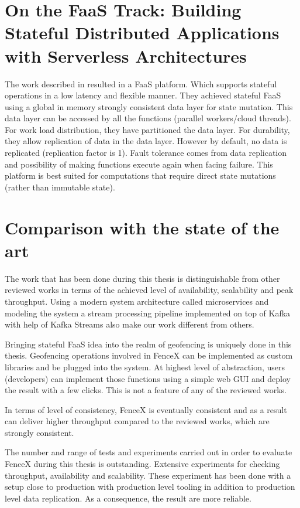 \documentclass[a4]{report}
\begin{document}
    \section{On the FaaS Track: Building Stateful Distributed Applications with Serverless Architectures}
    The work described in \cite{mutableStateless} resulted in a FaaS platform.
    Which supports stateful operations in a low latency and flexible manner.
    They achieved stateful FaaS using a global in memory strongly consistent data layer for state mutation.
    This data layer can be accessed by all the functions (parallel workers/cloud threads).
    For work load distribution, they have partitioned the data layer.
    For durability, they allow replication of data in the data layer.
    However by default, no data is replicated (replication factor is 1).
    Fault tolerance comes from data replication and possibility of making functions execute again when facing failure.
    This platform is best suited for computations that require direct state mutations (rather than immutable state).


    \section{Comparison with the state of the art}
    The work that has been done during this thesis is distinguishable from other reviewed works in terms of the
    achieved level of availability, scalability and peak throughput.
    Using a modern system architecture called microservices and modeling the system a stream processing pipeline
    implemented on top of Kafka with help of Kafka Streams also make our work different from others.

    Bringing stateful FaaS idea into the realm of geofencing is uniquely done in this thesis.
    Geofencing operations involved in FenceX can be implemented as custom libraries and be plugged into the system.
    At highest level of abstraction, users (developers) can implement those functions using a simple web GUI and
    deploy the result with a few clicks.
    This is not a feature of any of the reviewed works.

    In terms of level of consistency, FenceX is eventually consistent and as a result can deliver higher throughput
    compared to the reviewed works, which are strongly consistent.

    The number and range of tests and experiments carried out in order to evaluate FenceX during this thesis is
    outstanding.
    Extensive experiments for checking throughput, availability and scalability.
    These experiment has been done with a setup close to production with production level tooling in addition to
    production level data replication.
    As a consequence, the result are more reliable.
\end{document}
